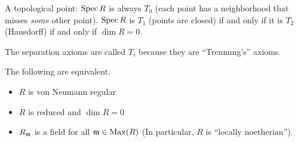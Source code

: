  \setcounter{lecture}{8}

 A topological point: $\operatorname{Spec} R$ is always $T_0$ (each point has a neighborhood that
 misses \emph{some} other point). $\operatorname{Spec} R$ is $T_1$ (points are closed) if and only if
 it is $T_2$ (Hausdorff) if and only if $\dim R=0$.
 \begin{remark}
   The separation axioms are called $T_i$ because they are ``Trennung's'' axioms.
 \end{remark}
 \begin{corollary}
   The following are equivalent.
   \begin{itemize}
     \item $R$ is von Neumann regular
     \item $R$ is reduced and $\dim R=0$
     \item $R_{\mathfrak{m}}$ is a field for all $\mathfrak{m}\in \operatorname{Max}(R)$ (In particular, $R$ is
     ``locally noetherian'').
   \end{itemize}
 \end{corollary}

